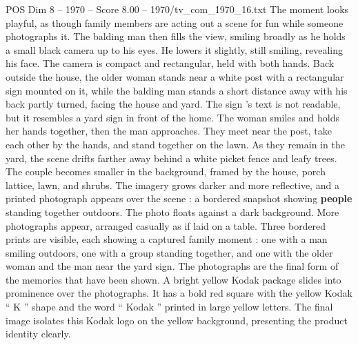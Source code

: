 \begin{textsample}{POS Dim 8 – 1970 – Score 8.00 – 1970/tv\_com\_1970\_16.txt}
The moment looks playful, as though family members are acting out a scene for fun while someone photographs it.
The balding man then fills the view, smiling broadly as he holds a small black camera up to his eyes.
He lowers it slightly, still smiling, revealing his face.
The camera is compact and rectangular, held with both hands.
Back outside the house, the older woman stands near a white post with a rectangular sign mounted on it, while the balding man stands a short distance away with his back partly turned, facing the house and yard.
The sign ’s text is not readable, but it resembles a yard sign in front of the home.
The woman smiles and holds her hands together, then the man approaches.
They meet near the post, take each other by the hands, and stand together on the lawn.
As they remain in the yard, the scene drifts farther away behind a white picket fence and leafy trees.
The couple becomes smaller in the background, framed by the house, porch lattice, lawn, and shrubs.
The imagery grows darker and more reflective, and a printed photograph appears over the scene : a bordered snapshot showing \textbf{people} standing together outdoors.
The photo floats against a dark background.
More photographs appear, arranged casually as if laid on a table.
Three bordered prints are visible, each showing a captured family moment : one with a man smiling outdoors, one with a group standing together, and one with the older woman and the man near the yard sign.
The photographs are the final form of the memories that have been shown.
A bright yellow Kodak package slides into prominence over the photographs.
It has a bold red square with the yellow Kodak “ K ” shape and the word “ Kodak ” printed in large yellow letters.
The final image isolates this Kodak logo on the yellow background, presenting the product identity clearly.

\end{textsample}
